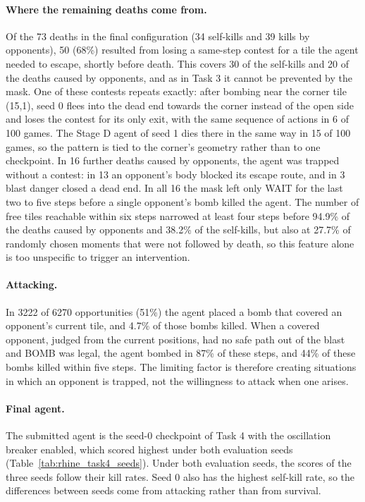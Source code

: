 \documentclass[11pt,a4paper]{report}
\begin{document}
	\paragraph{Where the remaining deaths come from.} Of the 73 deaths in the final configuration (34 self-kills and 39 kills by opponents), 50 (68\%) resulted from losing a same-step contest for a tile the agent needed to escape, shortly before death. This covers 30 of the self-kills and 20 of the deaths caused by opponents, and as in Task 3 it cannot be prevented by the mask. One of these contests repeats exactly: after bombing near the corner tile (15,1), seed 0 flees into the dead end towards the corner instead of the open side and loses the contest for its only exit, with the same sequence of actions in 6 of 100 games. The Stage D agent of seed 1 dies there in the same way in 15 of 100 games, so the pattern is tied to the corner's geometry rather than to one checkpoint. In 16 further deaths caused by opponents, the agent was trapped without a contest: in 13 an opponent's body blocked its escape route, and in 3 blast danger closed a dead end. In all 16 the mask left only WAIT for the last two to five steps before a single opponent's bomb killed the agent. The number of free tiles reachable within six steps narrowed at least four steps before 94.9\% of the deaths caused by opponents and 38.2\% of the self-kills, but also at 27.7\% of randomly chosen moments that were not followed by death, so this feature alone is too unspecific to trigger an intervention.
	
	\paragraph{Attacking.} In 3222 of 6270 opportunities (51\%) the agent placed a bomb that covered an opponent's current tile, and 4.7\% of those bombs killed. When a covered opponent, judged from the current positions, had no safe path out of the blast and BOMB was legal, the agent bombed in 87\% of these steps, and 44\% of these bombs killed within five steps. The limiting factor is therefore creating situations in which an opponent is trapped, not the willingness to attack when one arises.
	
	\paragraph{Final agent.} The submitted agent is the seed-0 checkpoint of Task 4 with the oscillation breaker enabled, which scored highest under both evaluation seeds (Table~\ref{tab:rhine_task4_seeds}). Under both evaluation seeds, the scores of the three seeds follow their kill rates. Seed 0 also has the highest self-kill rate, so the differences between seeds come from attacking rather than from survival.
	
\end{document}
